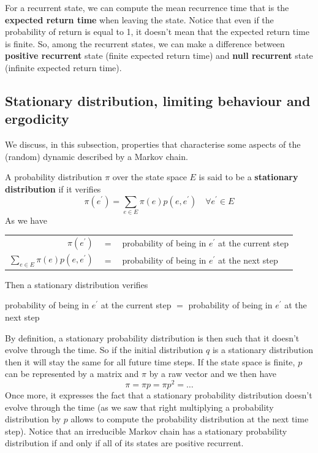 For a recurrent state, we can compute the mean recurrence time that is the \textbf{expected return time} when leaving the state. Notice that even if the probability of return is equal to 1, it doesn't mean that the expected return time is finite. So, among the recurrent states, we can make a difference between \textbf{positive recurrent} state (finite expected return time) and \textbf{null recurrent } state (infinite expected return time).

\subsection{Stationary distribution, limiting behaviour and ergodicity}

We discuss, in this subsection, properties that characterise some aspects of the (random) dynamic described by a Markov chain.

A probability distribution $\pi$ over the state space $E$ is said to be a \textbf{stationary distribution} if it verifies
\begin{equation}\pi\left(e^{\prime}\right)=\sum_{e \in E} \pi(e) p\left(e, e^{\prime}\right) \quad \forall e^{\prime} \in E\end{equation}
As we have\\
\begin{tabular}{rcl}
$\pi\left(e^{\prime}\right)$&$=$& probability of being in $e^{\prime}$ at the current step \\
$\sum_{e \in E} \pi(e) p\left(e, e^{\prime}\right)$&$=$& probability of being in $e^{\prime}$ at the next step
\end{tabular}

Then a stationary distribution verifies

probability of being in $e^{\prime}$ at the current step
 $=$ probability of being in $e^{\prime}$ at the next step

By definition, a stationary probability distribution is then such that it doesn't evolve through the time. So if the initial distribution $q$ is a stationary distribution then it will stay the same for all future time steps. If the state space is finite, $p$ can be represented by a matrix and $\pi$ by a raw vector and we then have
\begin{equation}\pi=\pi p=\pi p^{2}=\dots\end{equation}
Once more, it expresses the fact that a stationary probability distribution doesn't evolve through the time (as we saw that right multiplying a probability distribution by $p$ allows to compute the probability distribution at the next time step). Notice that an irreducible Markov chain has a stationary probability distribution if and only if all of its states are positive recurrent.

